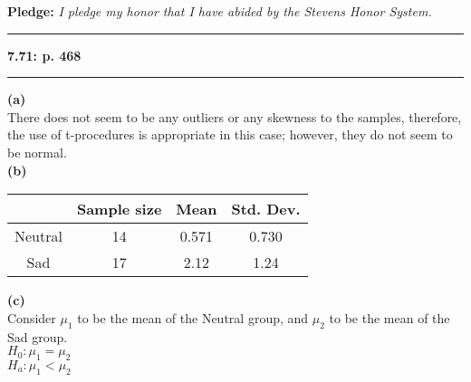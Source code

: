 \documentclass[11pt]{article}
\newcommand\question[2]{\vspace{.25in}\hrule\textbf{#1: #2}\vspace{.5em}\hrule\vspace{.10in}}
\renewcommand\part[1]{\vspace{.10in}\textbf{(#1)}}
\begin{document}
\raggedright
\newcommand\NAME{Eric Altenburg}  %
\newcommand\COURSE{MA-331}
\newcommand\HWNUM{4}              %


\begin{center}
	\textbf{Pledge:} \textit{I pledge my honor that I have abided by the Stevens Honor System.}
\end{center}

\question{7.71}{p. 468} 

\part{a}\\
	There does not seem to be any outliers or any skewness to the samples, therefore, the use of t-procedures is appropriate in this case; however, they do not seem to be normal. \\

\part{b}\\
	\begin{tabular}{c|c|c|c}
		& Sample size & Mean & Std. Dev. \\
		\hline
		Neutral & 14 & 0.571 & 0.730 \\
		\hline
		Sad & 17 & 2.12 & 1.24
	\end{tabular}

\part{c}\\
	Consider $\mu_{1}$ to be the mean of the Neutral group, and $\mu_{2}$ to be the mean of the Sad group.\\
	$H_{0} : \mu_{1} = \mu_{2}$\\
	$H_{a} : \mu_{1} < \mu_{2}$\\
\end{document}
